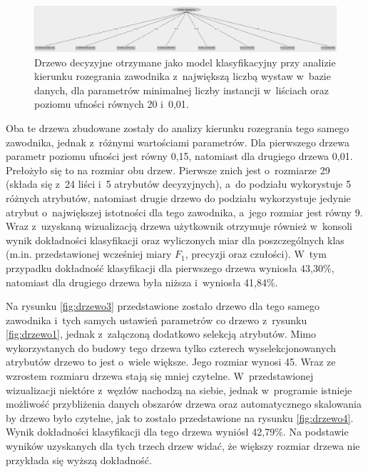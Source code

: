 \documentclass[a4paper,twoside,12pt]{book}
\begin{document}
\begin{figure}
\centering
\includegraphics[width=\columnwidth]{drzewoMM2099}
\caption{Drzewo decyzyjne otrzymane jako model klasyfikacyjny przy analizie kierunku rozegrania zawodnika z~największą liczbą wystaw w~bazie danych, dla parametrów minimalnej liczby instancji w~liściach oraz poziomu ufności równych 20 i~0,01.}
\label{fig:drzewo2}
\end{figure}

Oba te drzewa zbudowane zostały do analizy kierunku rozegrania tego samego zawodnika, jednak z~różnymi wartościami parametrów. Dla pierwszego drzewa parametr poziomu ufności jest równy 0,15, natomiast dla drugiego drzewa 0,01. Prełożyło się to na rozmiar obu drzew. Pierwsze znich jest o~rozmiarze 29 (składa się z~24 liści i~5 atrybutów decyzyjnych), a~do podziału wykorystuje 5 różnych atrybutów, natomiast drugie drzewo do podziału wykorzystuje jedynie atrybut o~największej istotności dla tego zawodnika, a~jego rozmiar jest równy 9. Wraz z~uzyskaną wizualizacją drzewa użytkownik otrzymuje również w~konsoli wynik dokładności klasyfikacji oraz wyliczonych miar dla poszczególnych klas (m.in. przedstawionej wcześniej miary $F_1$, precyzji oraz czułości). W~tym przypadku dokładność klasyfikacji dla pierwszego drzewa wyniosła 43,30\%, natomiast dla drugiego drzewa była niższa i~wyniosła 41,84\%.

Na rysunku \ref{fig:drzewo3} przedstawione zostało drzewo dla tego samego zawodnika i~tych samych ustawień parametrów co drzewo z~rysunku \ref{fig:drzewo1}, jednak z~załączoną dodatkowo selekcją atrybutów. Mimo wykorzystanych do budowy tego drzewa tylko czterech wyselekcjonowanych atrybutów drzewo to jest o~wiele większe. Jego rozmiar wynosi 45. Wraz ze wzrostem rozmiaru drzewa stają się mniej czytelne. W~przedstawionej wizualizacji niektóre z~węzłów nachodzą na siebie, jednak w~programie istnieje możliwość przybliżenia danych obszarów drzewa oraz automatycznego skalowania by drzewo było czytelne, jak to zostało przedstawione na rysunku \ref{fig:drzewo4}. Wynik dokładności klasyfikacji dla tego drzewa wyniósł 42,79\%. Na podstawie wyników uzyskanych dla tych trzech drzew widać, że większy rozmiar drzewa nie przykłada się wyższą dokładność.
\end{document}
